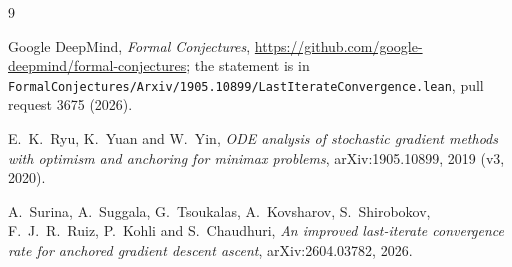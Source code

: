 \documentclass[11pt]{amsart}
\theoremstyle{remark}
\begin{document}
\begin{thebibliography}{9}

Google DeepMind, \emph{Formal Conjectures}, \url{https://github.com/google-deepmind/formal-conjectures}; the statement is in \texttt{FormalConjectures/Arxiv/1905.10899/LastIterateConvergence.lean}, pull request 3675 (2026).

E.~K.~Ryu, K.~Yuan and W.~Yin, \emph{ODE analysis of stochastic gradient methods with optimism and anchoring for minimax problems}, arXiv:1905.10899, 2019 (v3, 2020).

A.~Surina, A.~Suggala, G.~Tsoukalas, A.~Kovsharov, S.~Shirobokov, F.~J.~R.~Ruiz, P.~Kohli and S.~Chaudhuri, \emph{An improved last-iterate convergence rate for anchored gradient descent ascent}, arXiv:2604.03782, 2026.

\end{thebibliography}
\end{document}
